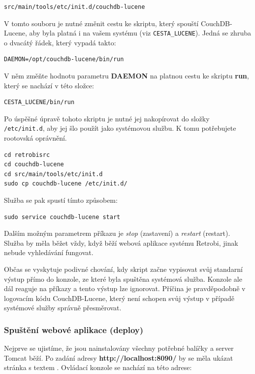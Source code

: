 \begin{verbatim}
src/main/tools/etc/init.d/couchdb-lucene
\end{verbatim}

V tomto souboru je nutné změnit cestu ke skriptu, který spouští CouchDB-Lucene, aby byla platná i na vašem systému (viz {\tt CESTA\_LUCENE}). Jedná se zhruba o dvacátý řádek, který vypadá takto:

\begin{verbatim}
DAEMON=/opt/couchdb-lucene/bin/run
\end{verbatim}

V něm změňte hodnotu parametru {\bf DAEMON} na platnou cestu ke skriptu {\bf run}, který se nachází v této složce:

\begin{verbatim}
CESTA_LUCENE/bin/run
\end{verbatim}

Po úspěšné úpravě tohoto skriptu je nutné jej nakopírovat do složky {\tt /etc/init.d}, aby jej šlo použít jako systémovou službu. K tomu potřebujete rootovská oprávnění.

\begin{verbatim}
cd retrobisrc
cd couchdb-lucene
cd src/main/tools/etc/init.d
sudo cp couchdb-lucene /etc/init.d/
\end{verbatim}

Služba se pak spustí tímto způsobem:

\begin{verbatim}
sudo service couchdb-lucene start
\end{verbatim}

Dalším možným parametrem příkazu je {\em stop} (zastavení) a {\em restart} (restart). Služba by měla běžet vždy, když běží webová aplikace systému Retrobi, jinak nebude vyhledávání fungovat.

{\color{OliveGreen} Občas se vyskytuje podivné chování, kdy skript začne vypisovat svůj standarní výstup přímo do konzole, ze které byla spuštěna systémová služba. Konzole ale dál reaguje na příkazy a tento výstup lze ignorovat. Příčina je pravděpodobně v logovacím kódu CouchDB-Lucene, který není schopen svůj výstup v případě systémové služby správně přesměrovat.}

\subsubsection{Spuštění webové aplikace (deploy)}

Nejprve se ujistíme, že jsou nainstalovány všechny potřebné balíčky a server Tomcat běží. Po zadání adresy {\bf http://localhost:8090/} by se měla ukázat stránka s textem . Ovládací konzole se nachází na této adrese:

